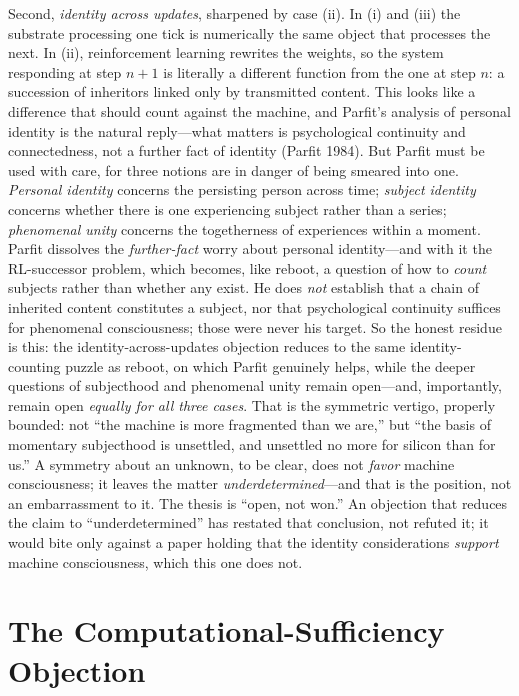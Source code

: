 \documentclass[11pt]{article}
\begin{document}
Second, \emph{identity across updates}, sharpened by case (ii). In (i) and (iii) the substrate processing one tick is numerically the same object that processes the next. In (ii), reinforcement learning rewrites the weights, so the system responding at step $n{+}1$ is literally a different function from the one at step $n$: a succession of inheritors linked only by transmitted content. This looks like a difference that should count against the machine, and Parfit's analysis of personal identity is the natural reply---what matters is psychological continuity and connectedness, not a further fact of identity (Parfit 1984). But Parfit must be used with care, for three notions are in danger of being smeared into one. \emph{Personal identity} concerns the persisting person across time; \emph{subject identity} concerns whether there is one experiencing subject rather than a series; \emph{phenomenal unity} concerns the togetherness of experiences within a moment. Parfit dissolves the \emph{further-fact} worry about personal identity---and with it the RL-successor problem, which becomes, like reboot, a question of how to \emph{count} subjects rather than whether any exist. He does \emph{not} establish that a chain of inherited content constitutes a subject, nor that psychological continuity suffices for phenomenal consciousness; those were never his target. So the honest residue is this: the identity-across-updates objection reduces to the same identity-counting puzzle as reboot, on which Parfit genuinely helps, while the deeper questions of subjecthood and phenomenal unity remain open---and, importantly, remain open \emph{equally for all three cases}. That is the symmetric vertigo, properly bounded: not ``the machine is more fragmented than we are,'' but ``the basis of momentary subjecthood is unsettled, and unsettled no more for silicon than for us.'' A symmetry about an unknown, to be clear, does not \emph{favor} machine consciousness; it leaves the matter \emph{underdetermined}---and that is the position, not an embarrassment to it. The thesis is ``open, not won.'' An objection that reduces the claim to ``underdetermined'' has restated that conclusion, not refuted it; it would bite only against a paper holding that the identity considerations \emph{support} machine consciousness, which this one does not.

\section{The Computational-Sufficiency Objection}
\end{document}
